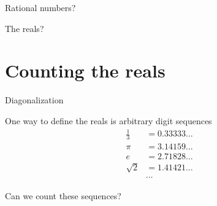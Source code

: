 \documentclass[xcolor=svgnames]{beamer}
\begin{document}
\begin{frame}{}
  \begin{center}
    \Huge Rational numbers?
  \end{center}
\end{frame}

\begin{frame}{}
  \begin{center}
    \Huge The reals?
  \end{center}
\end{frame}

\section{Counting the reals}

\begin{frame}{}
  \begin{center}
    \Huge Diagonalization
  \end{center}
\end{frame}

\begin{frame}{}
  One way to define the reals is arbitrary digit sequences \pause
  \begin{align}
    \frac{1}{3} & = 0.33333 \dots \\
       \pi      & = 3.14159 \dots \\
       e        & = 2.71828 \dots \\
       \sqrt{2} & = 1.41421 \dots \\
                & \cdots
  \end{align} \pause

  Can we count these sequences?
\end{frame}
\end{document}
